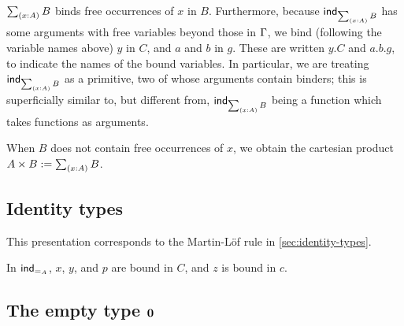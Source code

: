 $\tsm{x:A} B$ binds free occurrences of $x$ in $B$. Furthermore, because
$\ind{\tsm{x:A} B}$ has some arguments with free variables beyond those in $\Gamma$,
we bind (following the variable names above) $y$ in $C$, and $a$ and $b$ in $g$.
These are written $y.C$ and $a.b.g$, to indicate the names of the bound
variables. In particular, we are treating $\ind{\tsm{x:A} B}$ as a primitive,
two of whose arguments contain binders; this is superficially similar to, but
different from, $\ind{\tsm{x:A} B}$ being a function which takes functions as
arguments.

When $B$ does not contain free occurrences of $x$, we obtain the cartesian
product $A \times B := \tsm{x:A} B$.

\subsection{Identity types}

This presentation corresponds to the Martin-L\"{o}f rule in
\autoref{sec:identity-types}.


In $\mathsf{ind}_{{=}_A}$, $x$, $y$, and $p$ are bound in $C$, and $z$ is bound in
$c$.

\subsection{The empty type $\mathbf{0}$}

